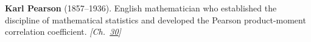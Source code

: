 \textbf{Karl Pearson} (1857–1936). English mathematician who established the discipline of mathematical statistics and developed the Pearson product-moment correlation coefficient. \emph{[Ch.~\hyperref[ch:simpsonsparadox]{30}]}

